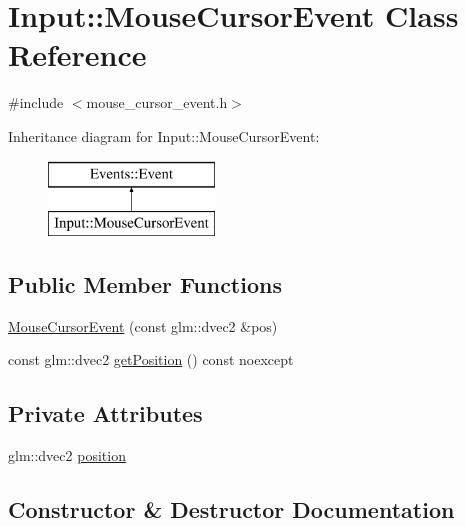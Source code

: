 \hypertarget{class_input_1_1_mouse_cursor_event}{}\section{Input\+:\+:Mouse\+Cursor\+Event Class Reference}
\label{class_input_1_1_mouse_cursor_event}


{\ttfamily \#include $<$mouse\+\_\+cursor\+\_\+event.\+h$>$}

Inheritance diagram for Input\+:\+:Mouse\+Cursor\+Event\+:\begin{figure}[H]
\begin{center}
\leavevmode
\includegraphics[height=2.000000cm]{class_input_1_1_mouse_cursor_event}
\end{center}
\end{figure}
\subsection*{Public Member Functions}
\begin{DoxyCompactItemize}
\item 
\hyperlink{class_input_1_1_mouse_cursor_event_afe151ce2560ff741558846c5a9a2699f}{Mouse\+Cursor\+Event} (const glm\+::dvec2 \&pos)
\item 
const glm\+::dvec2 \hyperlink{class_input_1_1_mouse_cursor_event_ac2fa10e773c505b02038da1fc7fe49ef}{get\+Position} () const noexcept
\end{DoxyCompactItemize}
\subsection*{Private Attributes}
\begin{DoxyCompactItemize}
\item 
glm\+::dvec2 \hyperlink{class_input_1_1_mouse_cursor_event_a8d62407dc243bc36660ea1c5e9970b65}{position}
\end{DoxyCompactItemize}


\subsection{Constructor \& Destructor Documentation}
\hypertarget{class_input_1_1_mouse_cursor_event_afe151ce2560ff741558846c5a9a2699f}{}
